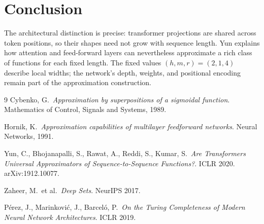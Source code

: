 \documentclass[11pt]{article}
\begin{document}
\section{Conclusion}

The architectural distinction is precise: transformer projections are
shared across token positions, so their shapes need not grow with
sequence length. Yun explains how attention and feed-forward layers
can nevertheless approximate a rich class of functions for each fixed
length. The fixed values $(h,m,r)=(2,1,4)$ describe local widths;
the network's depth, weights, and positional encoding remain part of
the approximation construction.

\begin{thebibliography}{9}
 Cybenko, G.\ \emph{Approximation by superpositions
of a sigmoidal function}. Mathematics of Control, Signals and Systems,
1989.

 Hornik, K.\ \emph{Approximation capabilities of
multilayer feedforward networks}. Neural Networks, 1991.

 Yun, C., Bhojanapalli, S., Rawat, A., Reddi, S.,
Kumar, S.\ \emph{Are Transformers Universal Approximators of
Sequence-to-Sequence Functions?}. ICLR 2020. arXiv:1912.10077.

 Zaheer, M.\ et al.\ \emph{Deep Sets}. NeurIPS 2017.

 P\'erez, J., Marinkovi\'c, J., Barcel\'o, P.\
\emph{On the Turing Completeness of Modern Neural Network Architectures}.
ICLR 2019.
\end{thebibliography}
\end{document}
